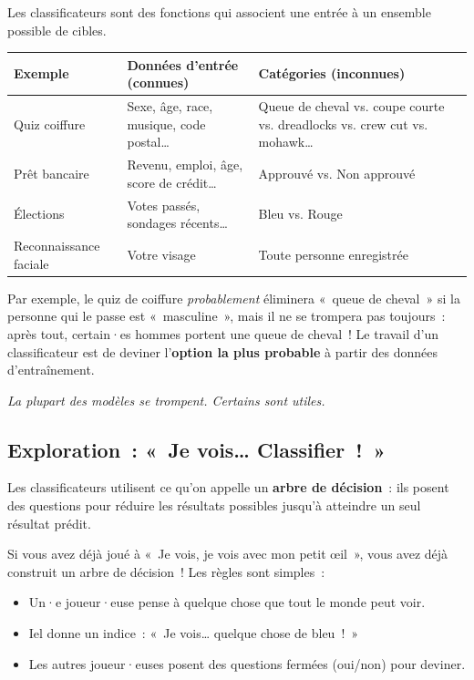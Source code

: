 \documentclass[12pt,a4paper]{article}
\begin{document}
\begin{keypointbox}
  Les classificateurs sont des fonctions qui associent une entrée à un ensemble possible de cibles.

  \vspace{0.5em}
  \begin{center}
  \begin{tabularx}{\textwidth}{l X X}
    \toprule
    \textbf{Exemple} & \textbf{Données d'entrée (connues)} & \textbf{Catégories (inconnues)} \\
    \midrule
    Quiz coiffure    & Sexe, âge, race, musique, code postal…       & Queue de cheval vs. coupe courte vs. dreadlocks vs. crew cut vs. mohawk… \\
    Prêt bancaire     & Revenu, emploi, âge, score de crédit…         & Approuvé vs. Non approuvé \\
    Élections         & Votes passés, sondages récents…              & Bleu vs. Rouge \\
    Reconnaissance faciale & Votre visage                            & Toute personne enregistrée \\
    \bottomrule
  \end{tabularx}
  \end{center}

  \vspace{0.5em}
  Par exemple, le quiz de coiffure \emph{probablement} éliminera «~queue de cheval~» si la personne qui le passe est «~masculine~», mais il ne se trompera pas toujours~: après tout, certain·es hommes portent une queue de cheval~! Le travail d'un classificateur est de deviner l'\textbf{option la plus probable} à partir des données d'entraînement.

  \vspace{0.5em}
  \emph{La plupart des modèles se trompent. Certains sont utiles.}
\end{keypointbox}

\subsection{Exploration~: «~Je vois… Classifier~!~»}

Les classificateurs utilisent ce qu'on appelle un \textbf{arbre de décision}~: ils posent des questions pour réduire les résultats possibles jusqu'à atteindre un seul résultat prédit.

Si vous avez déjà joué à «~Je vois, je vois avec mon petit œil~», vous avez déjà construit un arbre de décision~! Les règles sont simples~:
\begin{itemize}
  \item Un·e joueur·euse pense à quelque chose que tout le monde peut voir.
  \item Iel donne un indice~: «~Je vois… quelque chose de bleu~!~»
  \item Les autres joueur·euses posent des questions fermées (oui/non) pour deviner.
\end{itemize}
\end{document}
